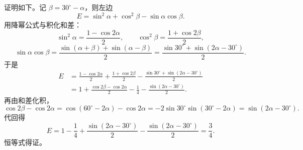 \begin{answer}
证明如下。记 $\beta=30^\circ-\alpha$，则左边
\nopagebreak[4]
\[E=\sin^2\alpha+\cos^2\beta-\sin\alpha\cos\beta.\]
用降幂公式与积化和差：
\nopagebreak[4]
\[\sin^2\alpha=\frac{1-\cos2\alpha}{2},\qquad
\cos^2\beta=\frac{1+\cos2\beta}{2},\]
\nopagebreak[4]
\[\sin\alpha\cos\beta=\frac{\sin(\alpha+\beta)+\sin(\alpha-\beta)}{2}
=\frac{\sin30^\circ+\sin(2\alpha-30^\circ)}{2}.\]
于是
\nopagebreak[4]
\[\begin{aligned}
E&=\frac{1-\cos2\alpha}{2}+\frac{1+\cos2\beta}{2}
-\frac{\sin30^\circ+\sin(2\alpha-30^\circ)}{2}\\
&=1+\frac{\cos2\beta-\cos2\alpha}{2}-\frac14-\frac{\sin(2\alpha-30^\circ)}{2}.
\end{aligned}\]
再由和差化积，
\nopagebreak[4]
\[\cos2\beta-\cos2\alpha
=\cos(60^\circ-2\alpha)-\cos2\alpha
=-2\sin30^\circ\sin(30^\circ-2\alpha)
=\sin(2\alpha-30^\circ).\]
代回得
\nopagebreak[4]
\[E=1-\frac14+\frac{\sin(2\alpha-30^\circ)}{2}-\frac{\sin(2\alpha-30^\circ)}{2}=\frac34.\]
恒等式得证。



\end{answer}
